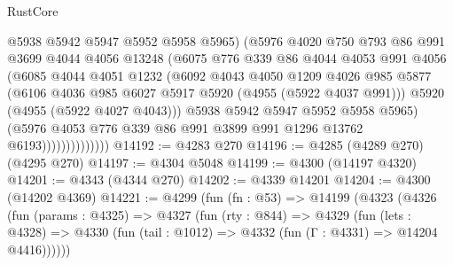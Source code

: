 \begin{lexlean}{RustCore}
\begin{coremodule}
                            @5938
                            @5942
                            @5947
                            @5952
                            @5958
                            @5965)
                          (@5976
                            @4020
                            @750
                            @793
                            @86
                            @991
                            @3699
                            @4044
                            @4056
                            @13248
                            (@6075
                              @776
                              @339
                              @86
                              @4044
                              @4053
                              @991
                              @4056
                              (@6085
                                @4044
                                @4051
                                @1232
                                (@6092
                                  @4043
                                  @4050
                                  @1209
                                  @4026
                                  @985
                                  @5877
                                  (@6106 @4036 @985 @6027 @5917 @5920 (@4955 (@5922 @4037 @991)))
                                  @5920
                                  (@4955 (@5922 @4027 @4043)))
                                @5938
                                @5942
                                @5947
                                @5952
                                @5958
                                @5965)
                              (@5976
                                @4053
                                @776
                                @339
                                @86
                                @991
                                @3899
                                @991
                                @1296
                                @13762
                                @6193))))))))))))))
@14192 := @4283 @270
@14196 := @4285 (@4289 @270) (@4295 @270)
@14197 := @4304 @5048
@14199 := @4300 (@14197 @4320)
@14201 := @4343 (@4344 @270)
@14202 := @4339 @14201
@14204 := @4300 (@14202 @4369)
@14221 := @4299
    (fun (fn : @53) =>
    @14199
      (@4323
        (@4326
          (fun (params : @4325) =>
          @4327
            (fun (rty : @844) =>
            @4329
              (fun (lets : @4328) =>
              @4330 (fun (tail : @1012) => @4332 (fun (Γ : @4331) => @14204 @4416))))))

\end{coremodule}
\end{lexlean}
